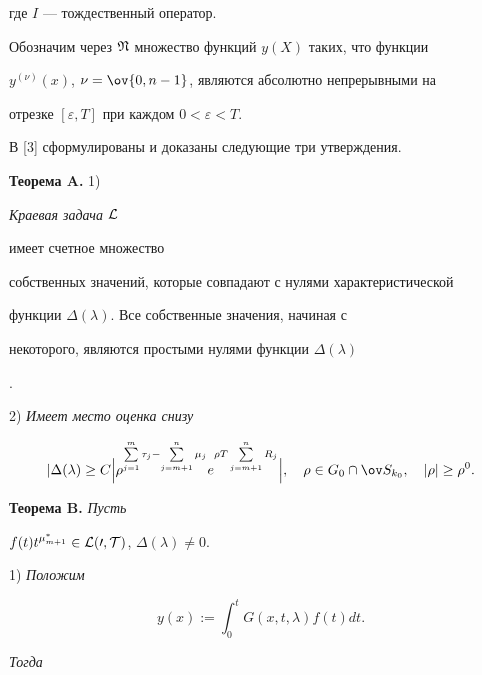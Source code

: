 где $I$ --- тождественный оператор.





Обозначим через $\frak N$ множество функций $y(X)$ таких, что функции


$y^{(\nu)}(x)$, $\nu=\ov{0,n-1}$, являются абсолютно непрерывными на


отрезке $[\varepsilon,T]$ при каждом $0<\varepsilon<T$.





В [3] сформулированы и доказаны следующие три утверждения.


\medskip





{\bf Теорема A.} 1) {\it Краевая задача $\cal L$


имеет счетное множество


собственных значений, которые совпадают с нулями характеристической


функции $\Delta(\lambda)$. Все собственные значения, начиная с


некоторого, являются простыми нулями функции $\Delta(\lambda)$}.





2) {\it Имеет место оценка снизу}


$$


|\Delta(\lambda)\ge C\Bigl|


\rho^{\suml^m_{j=1}\tau_j-\suml^n_{j=m+1}\mu_j}


e^{\rho T\suml^n_{j=m+1}R_j}\Bigr|,\quad


\rho\in G_0\cap\ov S_{k_0},\quad |\rho|\ge \rho^0.


$$


\medskip





{\bf Теорема B.} {\it Пусть}


$f(t)t^{\mu^*_{m+1}}\in\cal L(0,T)$, $\Delta(\lambda)\ne 0$.





1) {\it Положим}


\begin{equation}


y(x):=\int^t_0 G(x,t,\lambda)f(t)dt.


\end{equation}


{\it Тогда}


